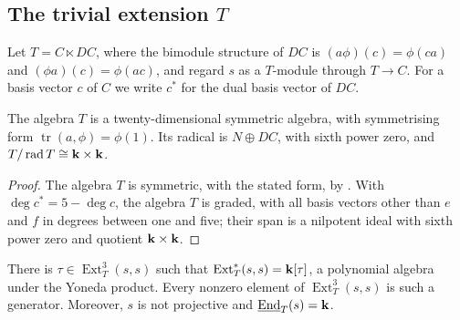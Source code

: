 \subsection{The trivial extension \texorpdfstring{$T$}{T}}
\label{subsec:algebra-T}

Let ${T=C\ltimes DC}$, where the bimodule structure of $DC$ is
${(a\phi)(c)=\phi(ca)}$ and ${(\phi a)(c)=\phi(ac)}$, and regard $s$ as a
$T$-module through ${T\to C}$. For a basis vector $c$ of $C$ we write $c^*$ for
the dual basis vector of $DC$.

\begin{lemma}
  \label{lemma:T-symmetric}
  The algebra $T$ is a twenty-dimensional symmetric algebra, with symmetrising
  form ${\operatorname{tr}(a,\phi)=\phi(1)}$. Its radical is ${N\oplus DC}$, with
  sixth power zero, and ${T/\operatorname{rad}T\cong\mathbf{k}\times\mathbf{k}}$.
\end{lemma}

\begin{proof}
  The algebra $T$ is symmetric, with the stated form, by
  . With ${\deg c^*=5-\deg c}$, the algebra $T$ is
  graded, with all basis vectors
  other than $e$ and $f$ in degrees between one and five; their span is a
  nilpotent ideal with sixth power zero and quotient ${\mathbf{k}\times\mathbf{k}}$.
\end{proof}

\begin{theorem}
  \label{thm:T-ext}
  There is ${\tau\in\operatorname{Ext}^3_T(s,s)}$ such that
  ${\operatorname{Ext}^*_T(s,s)=\mathbf{k}[\tau]}$, a polynomial algebra under the
  Yoneda product. Every nonzero element of $\operatorname{Ext}^3_T(s,s)$ is
  such a generator. Moreover, $s$ is not projective and
  ${\underline{\operatorname{End}}_T(s)=\mathbf{k}}$.
\end{theorem}

